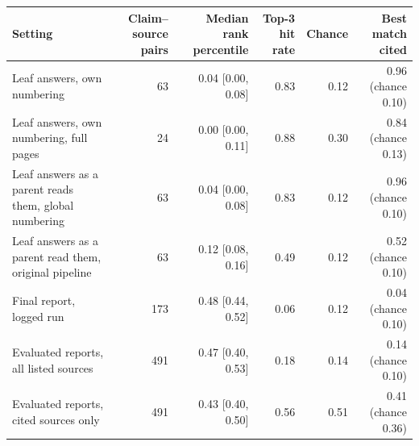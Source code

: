 \begin{tabular}{lrrrrr}
\toprule
Setting & Claim--source pairs & Median rank percentile & Top-3 hit rate & Chance & Best match cited \\
\midrule
Leaf answers, own numbering & 63 & 0.04 [0.00, 0.08] & 0.83 & 0.12 & 0.96 (chance 0.10) \\
Leaf answers, own numbering, full pages & 24 & 0.00 [0.00, 0.11] & 0.88 & 0.30 & 0.84 (chance 0.13) \\
Leaf answers as a parent reads them, global numbering & 63 & 0.04 [0.00, 0.08] & 0.83 & 0.12 & 0.96 (chance 0.10) \\
Leaf answers as a parent read them, original pipeline & 63 & 0.12 [0.08, 0.16] & 0.49 & 0.12 & 0.52 (chance 0.10) \\
Final report, logged run & 173 & 0.48 [0.44, 0.52] & 0.06 & 0.12 & 0.04 (chance 0.10) \\
Evaluated reports, all listed sources & 491 & 0.47 [0.40, 0.53] & 0.18 & 0.14 & 0.14 (chance 0.10) \\
Evaluated reports, cited sources only & 491 & 0.43 [0.40, 0.50] & 0.56 & 0.51 & 0.41 (chance 0.36) \\
\bottomrule
\end{tabular}
